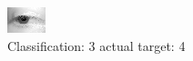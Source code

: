 \begin{figure}[h!]
\begin{center}
\includegraphics[width=0.60\columnwidth]{figures/ID2673_class_3_target_4.png}
\end{center}
\caption{ Classification: 3 actual target: 4}
\label{fig:ID2673_class_3_target_4}
\end{figure}
